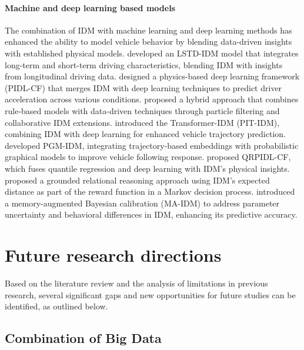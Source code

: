 \documentclass[a4paper,fleqn]{cas-sc}
\begin{document}
\paragraph{\textbf{Machine and deep learning based models}}
The combination of IDM with machine learning and deep learning methods has enhanced the ability to model vehicle behavior by blending data-driven insights with established physical models. \cite{chen_investigating_2020} developed an LSTD-IDM model that integrates long-term and short-term driving characteristics, blending IDM with insights from longitudinal driving data. \cite{moPhysicsInformedDeepLearningParadigm2021c} designed a physics-based deep learning framework (PIDL-CF) that merges IDM with deep learning techniques to predict driver acceleration across various conditions. \cite{bhattacharyya_hybrid_2022} proposed a hybrid approach that combines rule-based models with data-driven techniques through particle filtering and collaborative IDM extensions. \cite{gengPhysicsInformedTransformerModelVehicle2023b} introduced the Transformer-IDM (PIT-IDM), combining IDM with deep learning for enhanced vehicle trajectory prediction. \cite{kangTrajectoryBasedEmbeddingRandomCoefficients2023b} developed PGM-IDM, integrating trajectory-based embeddings with probabilistic graphical models to improve vehicle following response. \cite{liuQuantileRegressionPhysicsInformedDeepLearning2023c} proposed QRPIDL-CF, which fuses quantile regression and deep learning with IDM's physical insights. \cite{tang_grounded_2024} proposed a grounded relational reasoning approach using IDM's expected distance as part of the reward function in a Markov decision process. \cite{zhang_bayesian_2024} introduced a memory-augmented Bayesian calibration (MA-IDM) to address parameter uncertainty and behavioral differences in IDM, enhancing its predictive accuracy.

\section{Future research directions}

Based on the literature review and the analysis of limitations in previous research, several significant gaps and new opportunities for future studies can be identified, as outlined below.

\subsection{Combination of Big Data}
\end{document}

